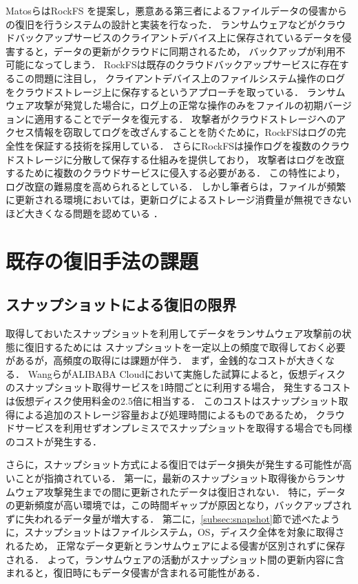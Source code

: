 MatosらはRockFS \cite{matos2018rockfs} を提案し，悪意ある第三者によるファイルデータの侵害からの復旧を行うシステムの設計と実装を行なった．
ランサムウェアなどがクラウドバックアップサービスのクライアントデバイス上に保存されているデータを侵害すると，データの更新がクラウドに同期されるため，
バックアップが利用不可能になってしまう．
RockFSは既存のクラウドバックアップサービスに存在するこの問題に注目し，
クライアントデバイス上のファイルシステム操作のログをクラウドストレージ上に保存するというアプローチを取っている．
ランサムウェア攻撃が発覚した場合に，ログ上の正常な操作のみをファイルの初期バージョンに適用することでデータを復元する．
攻撃者がクラウドストレージへのアクセス情報を窃取してログを改ざんすることを防ぐために，RockFSはログの完全性を保証する技術を採用している．
さらにRockFSは操作ログを複数のクラウドストレージに分散して保存する仕組みを提供しており，
攻撃者はログを改竄するために複数のクラウドサービスに侵入する必要がある．
この特性により，ログ改竄の難易度を高められるとしている．
しかし筆者らは，ファイルが頻繁に更新される環境においては，更新ログによるストレージ消費量が無視できないほど大きくなる問題を認めている \cite{matos2018rockfs}．

\section{既存の復旧手法の課題}
\label{sec:recovery-challenges}
\subsection{スナップショットによる復旧の限界}
取得しておいたスナップショットを利用してデータをランサムウェア攻撃前の状態に復旧するためには
スナップショットを一定以上の頻度で取得しておく必要があるが，高頻度の取得には課題が伴う．
まず，金銭的なコストが大きくなる．
Wangら\cite{wang2024ransom}がALIBABA Cloudにおいて実施した試算によると，仮想ディスクのスナップショット取得サービスを1時間ごとに利用する場合，
発生するコストは仮想ディスク使用料金の2.5倍に相当する．
このコストはスナップショット取得による追加のストレージ容量および処理時間によるものであるため，
クラウドサービスを利用せずオンプレミスでスナップショットを取得する場合でも同様のコストが発生する．

さらに，スナップショット方式による復旧ではデータ損失が発生する可能性が高いことが指摘されている\cite{wang2024ransom}．
第一に，最新のスナップショット取得後からランサムウェア攻撃発生までの間に更新されたデータは復旧されない．
特に，データの更新頻度が高い環境では，この時間ギャップが原因となり，バックアップされずに失われるデータ量が増大する．
第二に，\ref{subsec:snapshot}節で述べたように，スナップショットはファイルシステム，OS，ディスク全体を対象に取得されるため，
正常なデータ更新とランサムウェアによる侵害が区別されずに保存される．
よって，ランサムウェアの活動がスナップショット間の更新内容に含まれると，復旧時にもデータ侵害が含まれる可能性がある．

